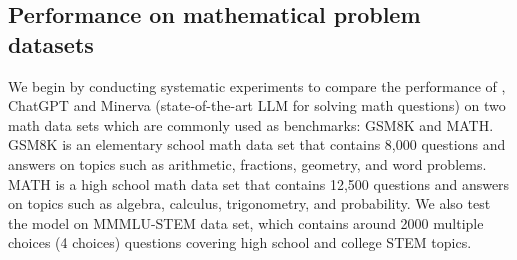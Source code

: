 \subsection{Performance on mathematical problem datasets}
We begin by conducting systematic experiments to compare the performance of \DV, ChatGPT and Minerva (state-of-the-art LLM for solving math questions) on two math data sets which are commonly used as benchmarks: GSM8K and MATH. GSM8K is an elementary school math data set that contains 8,000 questions and answers on topics such as arithmetic, fractions, geometry, and word problems. MATH is a high school math data set that contains 12,500 questions and answers on topics such as algebra, calculus, trigonometry, and probability. We also test the model on MMMLU-STEM data set, which contains around 2000 multiple choices (4 choices) questions covering high school and college STEM topics. 
\begin{comment}

\paragraph{Could it be that \DV's advantage is simply due to better memorization capabilities?} One possible explanation for \DV's superior performance on solving mathematical questions is that \DV \ has a better memory than ChatGPT or other LLMs, and that it can recall the questions or solutions from its pre-training data. However, based on the examples, we have reasons to believe that \DV \ does not rely on memorization but on understanding and applying mathematical concepts and rules. Here are some of our reasons:
\begin{enumerate}
    \item In the benchmarks, we tested \DV \ by asking it to (1) write the template, (2) write down the steps first then write down the final answer. The templates are not available online, and detailed solutions for datasets such as MMMLU-STEM are also not online (only the answer is). Moreover, even when the solution is possibly online, \textbf{we often observe that \DV \ uses a different approach than the existing ones.} For example, in the $\sin(a + b)$ example, \DV \ takes several reasonable, but unnecessary steps that are not part of a standard solution.
    \item We also crafted some mathematical questions by ourselves, carefully checking that these questions or close variants do not appear online. \DV \ still solves these questions like the standard ones. 
\end{enumerate}
\end{comment}
